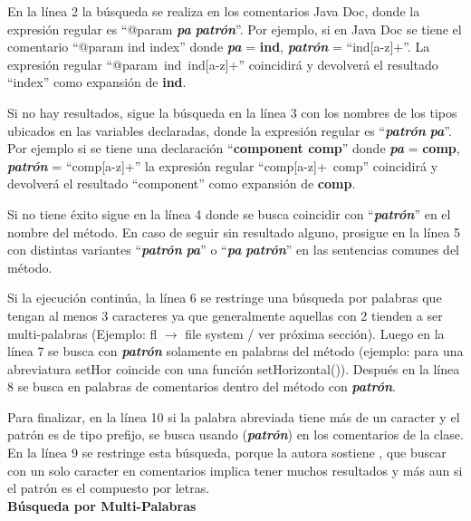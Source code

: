 \documentclass[a4paper,12pt]{report}
\makeatletter
\newcommand{\at}{\makeatletter @\makeatother}%
\makeatother
\begin{document}
En la línea 2 la búsqueda se realiza en los comentarios Java Doc, donde la expresión regular es “\at param \textit{\textbf{pa}} \textit{\textbf{patrón}}”. Por ejemplo, si en Java Doc se tiene el comentario “\at param ind index” donde \textit{\textbf{pa}} = \textbf{ind}, \textit{\textbf{patrón}} = \mbox{“ind[a-z]+”}. La expresión regular \mbox{“\at param ind ind[a-z]+”} coincidirá y devolverá el resultado  “index” como expansión de \textbf{ind}.

Si no hay resultados, sigue la búsqueda en la línea 3 con los nombres de los tipos ubicados en las variables declaradas, donde la expresión regular es “\textit{\textbf{patrón}} \textit{\textbf{pa}}”. Por ejemplo si se tiene una declaración “\textbf{component comp}” donde \textit{\textbf{pa}} = \textbf{comp}, \textit{\textbf{patrón}} = “comp[a-z]+”  la expresión regular \mbox{“comp[a-z]+ comp”} coincidirá y devolverá el resultado  “component” como expansión de \textbf{comp}.

Si no tiene éxito sigue en la línea 4 donde se busca coincidir con “\textit{\textbf{patrón}}” en el nombre del método. En caso de seguir sin resultado alguno, prosigue en la línea 5 con distintas variantes “\textit{\textbf{patrón}} \textit{\textbf{pa}}” o “\textit{\textbf{pa}} \textit{\textbf{patrón}}” en las sentencias comunes del método. 


Si la ejecución continúa, la línea 6 se restringe una búsqueda por palabras que tengan al menos 3 caracteres ya que generalmente aquellas con 2 tienden a ser multi-palabras (Ejemplo: \textsf{fl $\rightarrow$ file system} / ver próxima sección). Luego en la línea 7 se busca con \textit{\textbf{patrón}} solamente en palabras del método (ejemplo: para una abreviatura \textsf{setHor} coincide con una función \textsf{setHorizontal()}). Después en la línea 8 se busca en palabras de comentarios dentro del método con \textit{\textbf{patrón}}.

Para finalizar, en la línea 10 si la palabra abreviada tiene más de un caracter y el patrón es de tipo prefijo, se busca usando (\textit{\textbf{patrón}}) en los comentarios de la clase. En la línea 9 se restringe esta búsqueda, porque la autora sostiene \cite{EZH08}, que buscar con un solo caracter en comentarios implica tener muchos resultados y más aun si el patrón es el compuesto por letras.\\

\noindent \textbf{Búsqueda por Multi-Palabras\\}
\end{document}
